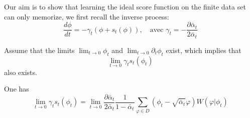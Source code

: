 \documentclass[a4paper,10pt]{article}
\theoremstyle{definition} %
\theoremstyle{definition} %
\theoremstyle{definition} %
\theoremstyle{definition} %
\begin{document}
Our aim is to show that learning the ideal score function on the finite data set can only memorize, we first recall the inverse process:
\begin{equation*}
    \frac{d\phi}{dt} =  -\gamma_t(\phi+s_t(\phi)), \quad \text{avec } \gamma_t = -\frac{\partial \bar \alpha_t}{2\bar \alpha_t} 
\end{equation*}






Assume that the limits \( \lim_{t \to 0} \phi_t \) and \( \lim_{t \to 0} \partial_t \phi_t \) exist, which implies that
\[
\lim_{t \to 0} \gamma_t s_t(\phi_t)
\]
also exists.


One has
\begin{equation*}
    \lim\limits_{t \to 0} \gamma_t s_t (\phi_t) = \lim\limits_{t \to 0} \frac{\partial \bar{\alpha}_t}{2\bar{\alpha}_t} \frac{1}{1 - \bar{\alpha}_t} \sum\limits_{\varphi \in D} \left( \phi_t - \sqrt{\bar{\alpha}_t} \varphi \right) W(\varphi | \phi_t)
\end{equation*}
\end{document}

